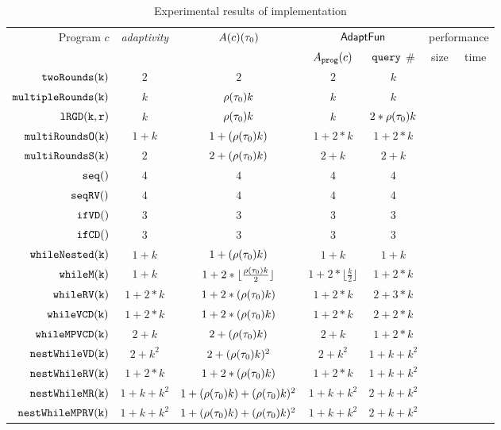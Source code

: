 \begin {table}[H]
    \caption{Experimental results of {\THESYSTEM} implementation}
        \label{tb:adapt-imp}
        \begin{center}
        \centering
{\footnotesize
        \begin{tabular}{ r | c | c | c | c | c | c }
        \multirow{2}{*}{Program $c$} & 
        \multirow{2}{*}{\emph{adaptivity}} 
         & \multirow{2}{*}{$A(c) (\mathtt{\tau}_0)$} 
         & \multicolumn{2}{c|}{$\textsf{AdaptFun}$}
         & \multicolumn{2}{c}{performance} \\ 
         \cline{4-7}
         & & & $A_{\mathtt{prog}}(c)$ & ${\tt query}$ \# & size & time \\
         \hline \hline
         $  \mathtt{twoRounds(k)}$ & $2$ & $2$ & $2$ & $k$ &  \\
         $  \mathtt{multipleRounds(k)}$ & $k$ & $ \rho(\mathtt{\tau}_0) k $ & $k$ & $k$  &    \\
         $  \mathtt{lRGD(k, r)}$ & $k$ & $\rho(\mathtt{\tau}_0) k$ & $k$ & $2 * \rho(\mathtt{\tau}_0) k$  &    \\
         $  \mathtt{multiRoundsO(k)}$ & $1 + k$ & $1 + (\rho(\mathtt{\tau}_0) k) $  & $1 +2 * k$ & $1 + 2*k$  &    \\
         $  \mathtt{multiRoundsS(k)}$    & $2$ & $2 + (\rho(\mathtt{\tau}_0) k) $ & $2 + k$ & $2 + k$  &    \\
         $  \mathtt{seq()}$ & $4$ & $4$ & $4$ & $4$ & \\ 
         $  \mathtt{seqRV()}$ & $4$ & $4$ & $4$ & $4$ & \\  
         $  \mathtt{ifVD()}$ & $3$ & $3$ & $3$ & $3$ & \\
         $  \mathtt{ifCD()}$ & $3$ & $3$ & $3$ & $3$  &    \\
         $  \mathtt{whileNested(k)}$ & $1+k$ & $1+ (\rho(\mathtt{\tau}_0) k)$ & $1+k$  &  $1+k$ &  \\
         $  \mathtt{whileM(k)}$ & $1 + k$ & $1 +2 * \lfloor \frac{\rho(\mathtt{\tau}_0) k}{2} \rfloor$ & $1 +2 * \lfloor \frac{k}{2} \rfloor$ & $1 + 2 * k$  &    \\
         $  \mathtt{whileRV(k)}$ & $1 + 2*k$ & $1 + 2*(\rho(\mathtt{\tau}_0) k)$ & $1 + 2*k$ & $2 + 3 * k$  &    \\
         $  \mathtt{whileVCD(k)}$ & $1 + 2*k$ & $1 + 2*(\rho(\mathtt{\tau}_0) k)$ & $1 + 2 * k$ & $2 + 2 * k$  &    \\
         $  \mathtt{whileMPVCD(k)}$ & $2 + k$ & $2 + (\rho(\mathtt{\tau}_0) k)$  & $2 + k$ & $1 + 2 * k$   &    \\
         $  \mathtt{nestWhileVD(k)}$ & $2 + k^2$ & $2 + (\rho(\mathtt{\tau}_0) k)^2$  & $2 + k^2$ & $1 + k + k^2$   &    \\
         $  \mathtt{nestWhileRV(k)}$ & $1 + 2*k$ & $1 + 2*(\rho(\mathtt{\tau}_0) k)$ & $1 + 2*k$ &  $1 + k + k^2$   &    \\
         $  \mathtt{nestWhileMR(k)}$ & $1 + k + k^2$ & $1 + (\rho(\mathtt{\tau}_0) k) + (\rho(\mathtt{\tau}_0) k)^2$  & $1 + k + k^2$ &  $2 + k + k^2$  &    \\
         $  \mathtt{nestWhileMPRV(k)}$ & $1 + k + k^2$ & $1 + (\rho(\mathtt{\tau}_0) k) + (\rho(\mathtt{\tau}_0) k)^2$  & $1 + k + k^2$ &  $2 + k + k^2$  &    \\
        \end{tabular}
}        
\end{center}
\end{table}
%
